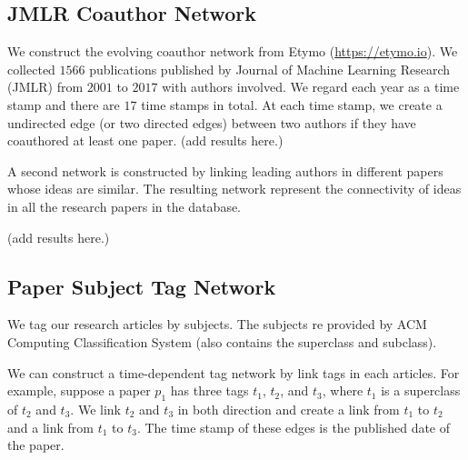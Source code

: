 \documentclass[12pt]{article}
\theoremstyle{definition}
\begin{document}
\subsection{JMLR Coauthor Network}
\label{sec:jmlr-coauth-netw}


We construct the evolving coauthor network from Etymo (\url{https://etymo.io}).
We collected $1566$ publications published by Journal of Machine Learning Research (JMLR) from $2001$ to $2017$ with authors involved. We regard each year
as a time stamp and there are $17$ time stamps in total. At each time stamp, we
create a undirected edge (or two directed edges) between two authors if they have coauthored at least one paper.
(add results here.)

A second network is constructed by linking leading authors in different papers whose
ideas are similar. The resulting network represent the connectivity of ideas in all the research papers in the database.

(add results here.)


\subsection{Paper Subject Tag Network}

We tag our research articles by subjects. The subjects re provided by ACM Computing Classification System (also contains the superclass and subclass).

We can construct a time-dependent tag network by link tags in each articles. For example,
suppose a paper $p_1$ has three tags $t_1$, $t_2$, and $t_3$, where $t_1$ is a superclass of $t_2$ and $t_3$.
We link $t_2$ and $t_3$ in both direction and create a link from $t_1$ to $t_2$ and a link from $t_1$ to $t_3$.
The time stamp of these edges is the published date of the paper.







\end{document}
